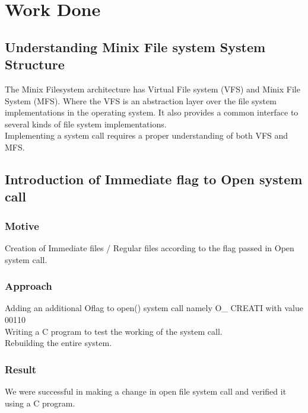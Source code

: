 \chapter{Work Done}

\section{Understanding Minix File system System Structure}

The Minix Filesystem architecture has Virtual File system (VFS) and Minix File System (MFS). Where the VFS is an abstraction layer over the file system implementations in the operating system. It also provides a common interface to several kinds of file system implementations. \\
Implementing a system call requires a proper understanding of both VFS and MFS.

\section{Introduction of Immediate flag to Open system call}
\subsection{Motive}
Creation of Immediate files / Regular files according to the flag passed in Open system call.
\subsection{Approach}
Adding an additional Oflag to open() system call namely O\_ CREATI  with value 00110 \\	
Writing a C program to test the working of the system call.\\
Rebuilding the entire system.
\subsection{Result}
We were successful in making a change in open file system call and verified it using a C program.



